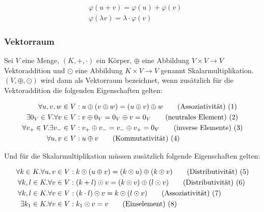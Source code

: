 \documentclass[a4paper,fontsize=12pt,toc=bib,parskip=half,ngerman]{scrartcl}
\begin{document}
\begin{align}
	&\varphi(u+v) = \varphi(u) + \varphi(v) \\
	&\varphi(\lambda v) = \lambda \cdot \varphi(v)
\end{align}

\subsubsection{Vektorraum}
Sei $V$ eine Menge, $(K, +, \cdot )$ ein K\"orper, $\oplus$ eine Abbildung $V \times V \rightarrow V$  Vektoraddition und $\odot$ eine Abbildung $K \times V \rightarrow V$ genannt Skalarmultiplikation. $(V, \oplus, \odot)$ wird dann als Vektorraum bezeichnet, wenn zus\"atzlich f\"ur die Vektoraddition die folgenden Eigenschaften gelten: 

\begin{align}
	\forall u,v,w \in V&: u \oplus (v \oplus w ) = (u \oplus v ) \oplus w 	\tag{Assoziativit\"at) (\addtocounter{equation}{1}\theequation}\\
	\exists 0_V \in V. \forall v \in V&: v\oplus 0_V = 0_V \oplus v = 0_V 	\tag{neutrales Element) (\addtocounter{equation}{1}\theequation}\\
	\forall v_+ \in V. \exists v_- \in V&: v_+ \oplus v_- = v_- \oplus v_+ = 0_V	\tag{inverse Elemente) (\addtocounter{equation}{1}\theequation}\\
	\forall u, v \in V&: u \oplus v    \tag{Kommutativit\"at) (\addtocounter{equation}{1}\theequation}
\end{align}

Und f\"ur die Skalarmultiplikation m\"ussen zus\"atzlich folgende Eigenschaften gelten:

\begin{align}
	\forall k \in K. \forall u,v \in V&: k \odot (u \oplus v ) = (k \odot u ) \oplus( k \odot v) 	\tag{Distributivit\"at) (\addtocounter{equation}{1}\theequation}\\
	\forall k, l \in K. \forall v \in V&: ( k + l ) \odot v = (k \odot v ) \oplus( l \odot v) 	\tag{Distributivit\"at) (\addtocounter{equation}{1}\theequation}\\
	\forall k, l \in K. \forall v \in V&: (k \cdot l) \odot v = k \odot (l \odot v)	\tag{Assoziativit\"at) (\addtocounter{equation}{1}\theequation}\\
	\exists k_1 \in K. \forall v \in V&: k_1 \odot v = v	\tag{Einselement) (\addtocounter{equation}{1}\theequation}
\end{align}
\end{document}
